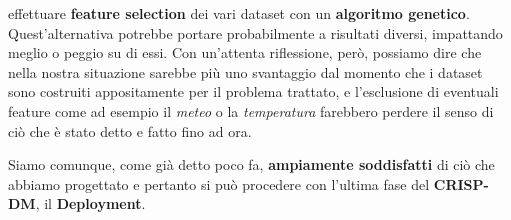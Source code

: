 \documentclass[a4paper, 11pt, oneside]{report}
\begin{document}
            effettuare \textbf{feature selection} dei vari dataset con un \textbf{algoritmo genetico}.
            Quest'alternativa potrebbe portare probabilmente a risultati diversi, impattando meglio o peggio
            su di essi. Con un'attenta riflessione, però, possiamo dire che nella nostra situazione sarebbe più uno svantaggio
            dal momento che i dataset sono costruiti appositamente per il problema trattato, e l'esclusione di eventuali
            feature come ad esempio il \emph{meteo} o la \emph{temperatura} farebbero perdere il senso di ciò che è stato
            detto e fatto fino ad ora.
            \\
            \par \noindent Siamo comunque, come già detto poco fa, \textbf{ampiamente soddisfatti} di ciò che abbiamo progettato
            e pertanto si può procedere con l'ultima fase del \textbf{CRISP-DM}, il \textbf{Deployment}.
            \newpage
\end{document}
